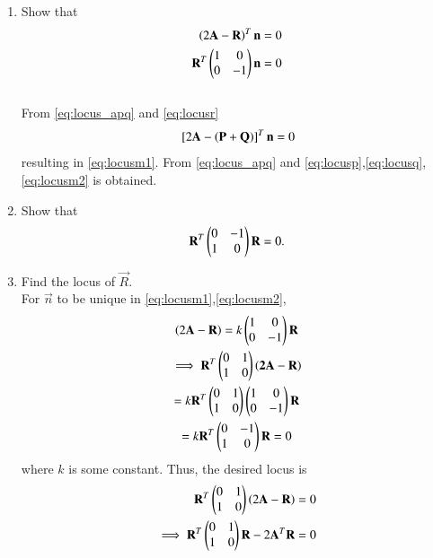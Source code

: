 \documentclass[journal,12pt,twocolumn]{IEEEtran}
\renewcommand\thesection{\arabic{section}}
\begin{document}
\begin{enumerate}[label=\thesection.\arabic*
,ref=\thesection.\theenumi]
\\
\solution 
Trivial using \eqref{eq:line_normal} and \eqref{eq:normal_slope}.
%
\item Show that
\begin{align}
\left(2\mathbf{A}-\mathbf{R}\right)^T\mathbf{n} &= 0
\label{eq:locusm1}
\\
\label{eq:locusm2}
\mathbf{R}^T\begin{pmatrix}1 & 0\\ 0 & -1\end{pmatrix}\mathbf{n} &= 0
\end{align}
\\
\solution
From \eqref{eq:locus_apq} and \eqref{eq:locusr}
\begin{align}
{}\left[2\mathbf{A}-\left(\mathbf{P}+\mathbf{Q}\right)\right]^T\mathbf{n} = 0
\end{align}
%
resulting in  \eqref{eq:locusm1}.
From \eqref{eq:locus_apq} and \eqref{eq:locusp},\eqref{eq:locusq}, \eqref{eq:locusm2} is obtained.
%
\item Show that
\begin{equation}
\mathbf{R}^{T}\begin{pmatrix}0 & -1\\ 1 & 0\end{pmatrix}\mathbf{R} = 0.
\end{equation}
\item Find the locus of $\vec{R}$.
\\
\solution
For $\vec{n}$ to be unique in \eqref{eq:locusm1},\eqref{eq:locusm2},
\begin{multline}
\left(2\mathbf{A}-\mathbf{R}\right) = k \begin{pmatrix}1 & 0\\ 0 & -1\end{pmatrix}\mathbf{R}
\\
\implies \mathbf{R}^{T}\begin{pmatrix}0 & 1\\ 1 & 0\end{pmatrix}\left(\mathbf{2A}-\mathbf{R}\right) 
\\
= k \mathbf{R}^{T}\begin{pmatrix}0 & 1\\ 1 & 0\end{pmatrix}\begin{pmatrix}1 & 0\\ 0 & -1\end{pmatrix}\mathbf{R}
\\
= k \mathbf{R}^{T}\begin{pmatrix}0 & -1\\ 1 & 0\end{pmatrix}\mathbf{R} = 0
\end{multline}
%
where $k$ is some constant.  Thus, the desired locus is
\begin{align}
 \mathbf{R}^{T}\begin{pmatrix}0 & 1\\ 1 & 0\end{pmatrix}\left(2\mathbf{A}-\mathbf{R}\right) 
&= 0
\\
\implies \mathbf{R}^{T}\begin{pmatrix}0 & 1\\ 1 & 0\end{pmatrix}\mathbf{R}- 2\mathbf{A}^T\mathbf{R}
&= 0
\end{align}
\end{enumerate}
%
\end{document}
